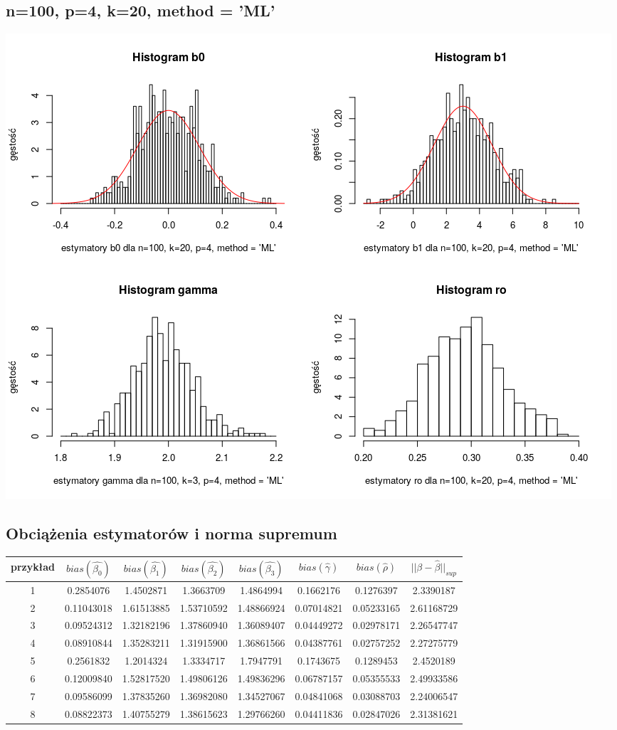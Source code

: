 \documentclass[a4paper,11pt]{article}
\begin{document}
\subsection{n=100, p=4,  k=20,  method = 'ML'}
\includegraphics[scale=.8]{Rplot65.png} 

\subsection{Obciążenia estymatorów i norma  supremum \beta}

\begin{center}
\begin{tabular}{|c|c|c|c|c|c|c|c|} \hline

 przykład & $bias(\widehat{\beta_{0}})$ &   $bias(\widehat{\beta_{1}})$  &   $bias(\widehat{\beta_{2}})$   &  $bias(\widehat{\beta_{3}})$  &  $bias(\widehat{\gamma})$  &   $bias(\widehat{\rho})$   & $ ||\beta - \widehat{\beta}||_{sup}$ \\ \hline
1 & 0.2854076  &1.4502871  & 1.3663709  & 1.4864994 &  0.1662176  & 0.1276397  & 2.3390187 \\
  2&
0.11043018  & 1.61513885  & 1.53710592  & 1.48866924  & 0.07014821  & 0.05233165  & 2.61168729  \\
3 &
0.09524312  & 1.32182196  & 1.37860940  & 1.36089407  & 0.04449272  & 0.02978171  & 2.26547747 \\
4 &
0.08910844 &  1.35283211  & 1.31915900  & 1.36861566  & 0.04387761  & 0.02757252  & 2.27275779 \\
5 &
 0.2561832   & 1.2014324   & 1.3334717   & 1.7947791   & 0.1743675   & 0.1289453   & 2.4520189 \\
 6 &
0.12009840  & 1.52817520  & 1.49806126  & 1.49836296  & 0.06787157  & 0.05355533  & 2.49933586 \\
7 &
0.09586099  & 1.37835260  & 1.36982080  & 1.34527067  & 0.04841068  & 0.03088703  & 2.24006547  \\
8 &
0.08822373  & 1.40755279  & 1.38615623  & 1.29766260  & 0.04411836  & 0.02847026  & 2.31381621 \\ \hline

\end{tabular}
\end{center}
\end{document}
